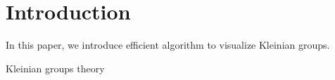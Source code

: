 
\section{Introduction}

In this paper, we introduce efficient algorithm to visualize Kleinian
groups. 

Kleinian groups theory
